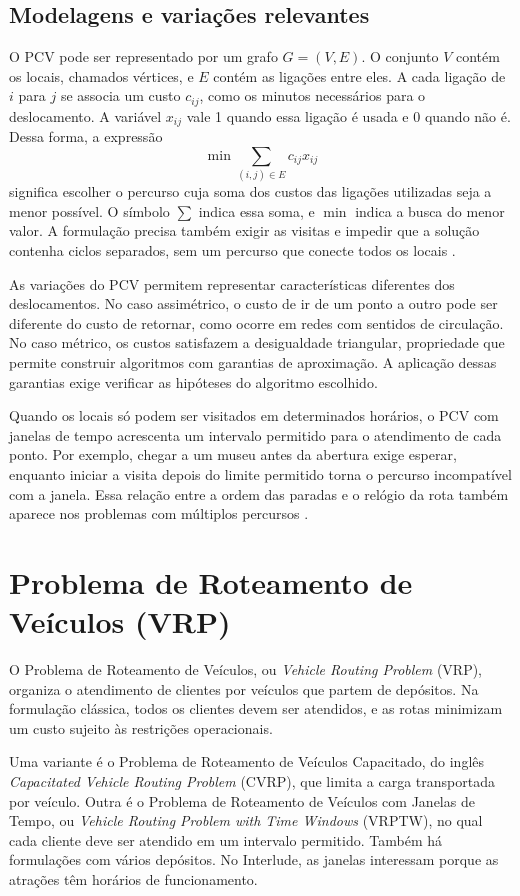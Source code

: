 \subsection{Modelagens e variações relevantes}

O PCV pode ser representado por um grafo $G=(V,E)$. O conjunto $V$ contém os locais, chamados vértices, e $E$ contém as ligações entre eles. A cada ligação de $i$ para $j$ se associa um custo $c_{ij}$, como os minutos necessários para o deslocamento. A variável $x_{ij}$ vale 1 quando essa ligação é usada e 0 quando não é. Dessa forma, a expressão
\[
\min \sum_{(i,j)\in E} c_{ij}x_{ij}
\]
significa escolher o percurso cuja soma dos custos das ligações utilizadas seja a menor possível. O símbolo $\sum$ indica essa soma, e $\min$ indica a busca do menor valor. A formulação precisa também exigir as visitas e impedir que a solução contenha ciclos separados, sem um percurso que conecte todos os locais \cite{combinatorial_opt_tsp_chapter}.

As variações do PCV permitem representar características diferentes dos deslocamentos. No caso assimétrico, o custo de ir de um ponto a outro pode ser diferente do custo de retornar, como ocorre em redes com sentidos de circulação. No caso métrico, os custos satisfazem a desigualdade triangular, propriedade que permite construir algoritmos com garantias de aproximação. A aplicação dessas garantias exige verificar as hipóteses do algoritmo escolhido.

Quando os locais só podem ser visitados em determinados horários, o PCV com janelas de tempo acrescenta um intervalo permitido para o atendimento de cada ponto. Por exemplo, chegar a um museu antes da abertura exige esperar, enquanto iniciar a visita depois do limite permitido torna o percurso incompatível com a janela. Essa relação entre a ordem das paradas e o relógio da rota também aparece nos problemas com múltiplos percursos \cite{google_vrptw}.

\section{Problema de Roteamento de Veículos (VRP)}

O Problema de Roteamento de Veículos, ou \textit{Vehicle Routing Problem} (VRP), organiza o atendimento de clientes por veículos que partem de depósitos. Na formulação clássica, todos os clientes devem ser atendidos, e as rotas minimizam um custo sujeito às restrições operacionais.

Uma variante é o Problema de Roteamento de Veículos Capacitado, do inglês \textit{Capacitated Vehicle Routing Problem} (CVRP), que limita a carga transportada por veículo. Outra é o Problema de Roteamento de Veículos com Janelas de Tempo, ou \textit{Vehicle Routing Problem with Time Windows} (VRPTW), no qual cada cliente deve ser atendido em um intervalo permitido. Também há formulações com vários depósitos. No Interlude, as janelas interessam porque as atrações têm horários de funcionamento.

